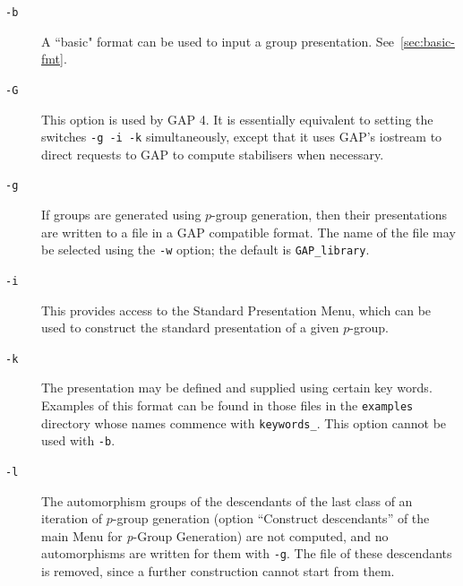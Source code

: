 \documentclass[12pt]{article}
\begin{document}
\enlargethispage*{1\baselineskip}
\begin{description}


\item[\texttt{-b}\hspace*{1em}]
      A ``basic" format can be used to input a group presentation.
      See~\ref{sec:basic-fmt}.

\item[\texttt{-G}\hspace*{1em}]
      This option is used by {\sf GAP} 4. It is essentially equivalent
      to setting the switches \texttt{-g -i -k} simultaneously, except
      that it uses {\sf GAP}'s iostream to direct requests to {\sf GAP}
      to compute stabilisers when necessary.

\item[\texttt{-g}\hspace*{1em}]
      If groups are generated using $p$-group generation, then 
      their presentations are written to a file
      in a {\sf GAP} compatible format.
      The name of the file may be selected using the \texttt{-w} option;
      the default is \texttt{GAP\_library}.

\item[\texttt{-i}\hspace*{1em}]
      This provides access to the Standard Presentation Menu,
      which can be used to construct the standard presentation
      of a given $p$-group.

\item[\texttt{-k}\hspace*{1em}]
      The presentation may be defined and supplied using certain
      key words. Examples of this format can be found in those 
      files in the \texttt{examples} directory whose names commence with 
      \texttt{keywords\_}. This option cannot be used with \texttt{-b}.

\item[\texttt{-l}\hspace*{1em}]
      The automorphism groups of the descendants of the last class of an
      iteration of $p$-group generation (option ``Construct descendants''
      of the main Menu for {\it p}-Group Generation) are not computed,
      and no automorphisms are written for them with \texttt{-g}.
      The file of these descendants is removed, since a further
      construction cannot start from them.


\end{description}
\end{document}
